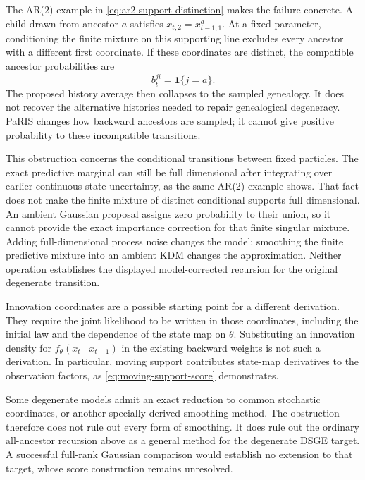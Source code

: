 \documentclass[11pt]{article}
\begin{document}
The AR(2) example in \eqref{eq:ar2-support-distinction} makes the failure
concrete. A child drawn from ancestor $a$ satisfies
$x_{t,2}=x_{t-1,1}^a$. At a fixed parameter, conditioning the finite mixture
on this supporting line excludes every ancestor with a different first
coordinate. If these coordinates are distinct, the compatible ancestor
probabilities are
\begin{equation}
 b_t^{ji}=\mathbf 1\{j=a\}.
 \label{eq:degenerate-ancestor-collapse}
\end{equation}
The proposed history average then collapses to the sampled genealogy. It
does not recover the alternative histories needed to repair genealogical
degeneracy. PaRIS changes how backward ancestors are sampled; it cannot
give positive probability to these incompatible transitions.

This obstruction concerns the conditional transitions between fixed
particles. The exact predictive marginal can still be full dimensional
after integrating over earlier continuous state uncertainty, as the same
AR(2) example shows. That fact does not make the finite mixture of distinct
conditional supports full dimensional. An ambient Gaussian proposal assigns
zero probability to their union, so it cannot provide the exact importance
correction for that finite singular mixture. Adding full-dimensional process
noise changes the model; smoothing the finite predictive mixture into an
ambient KDM changes the approximation. Neither operation establishes the
displayed model-corrected recursion for the original degenerate transition.

Innovation coordinates are a possible starting point for a different
derivation. They require the joint likelihood to be written in those
coordinates, including the initial law and the dependence of the state map
on $\theta$. Substituting an innovation density for
$f_\theta(x_t\mid x_{t-1})$ in the existing backward weights is not such a
derivation. In particular, moving support contributes state-map derivatives
to the observation factors, as \eqref{eq:moving-support-score} demonstrates.

Some degenerate models admit an exact reduction to common stochastic
coordinates, or another specially derived smoothing method. The obstruction
therefore does not rule out every form of smoothing. It does rule out the
ordinary all-ancestor recursion above as a general method for the degenerate
DSGE target. A successful full-rank Gaussian comparison would establish no
extension to that target, whose score construction remains unresolved.
\end{document}

